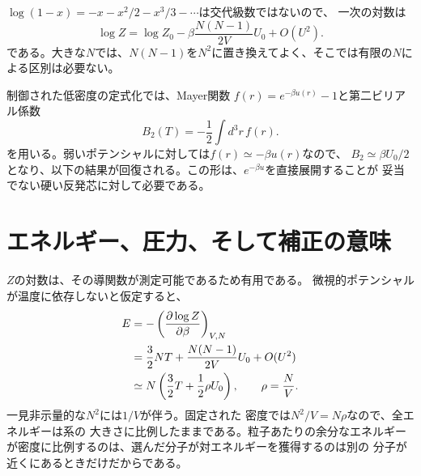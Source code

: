 \begin{classroomqa}
\end{classroomqa}

\(\log(1-x)=-x-x^2/2-x^3/3-\cdots\)は交代級数ではないので、
一次の対数は
\begin{equation}
 \log Z
 =
 \log Z_0
 -\beta\frac{N(N-1)}{2V}U_0
 +O(U^2).
 \label{eq:sm6-logz-correction}
\end{equation}
である。大きな\(N\)では、\(N(N-1)\)を\(N^2\)に置き換えてよく、そこでは有限の\(N\)による区別は必要ない。

\begin{remark}
制御された低密度の定式化では、Mayer関数
\(f(r)=e^{-\beta u(r)}-1\)と第二ビリアル係数
\begin{equation}
 B_2(T)=-\frac{1}{2}\int d^3r\,f(r).
 \label{eq:sm6-second-virial}
\end{equation}
を用いる。弱いポテンシャルに対しては\(f(r)\simeq-\beta u(r)\)なので、
\(B_2\simeq\beta U_0/2\)となり、以下の結果が回復される。この形は、\(e^{-\beta u}\)を直接展開することが
妥当でない硬い反発芯に対して必要である。
\end{remark}

\section{エネルギー、圧力、そして補正の意味}

\(Z\)の対数は、その導関数が測定可能であるため有用である。
微視的ポテンシャルが温度に依存しないと仮定すると、
\begin{align}
 E
 &=-\left(\frac{\partial\log Z}{\partial\beta}\right)_{V,N} \notag\\
 &=
 \frac{3}{2}NT
 +\frac{N(N-1)}{2V}U_0+O(U^2) \notag\\
 &\simeq
 N\left(\frac{3}{2}T+\frac{1}{2}\rho U_0\right),
 \qquad
 \rho=\frac{N}{V}.
 \label{eq:sm6-energy-correction}
\end{align}
一見非示量的な\(N^2\)には\(1/V\)が伴う。固定された
密度では\(N^2/V=N\rho\)なので、全エネルギーは系の
大きさに比例したままである。粒子あたりの余分なエネルギーが密度に比例するのは、選んだ分子が対エネルギーを獲得するのは別の
分子が近くにあるときだけだからである。

